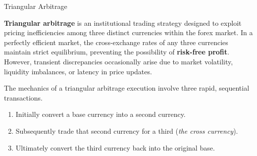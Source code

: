 \documentclass[10pt]{article}
\begin{document}
    \begin{core}{Triangular Arbitrage}

      \textbf{Triangular arbitrage} is an institutional trading strategy designed to exploit pricing inefficiencies among three distinct currencies within the forex market. In a perfectly efficient market, the cross-exchange rates of any three currencies maintain strict equilibrium, preventing the possibility of \textbf{risk-free profit}. However, transient discrepancies occasionally arise due to market volatility, liquidity imbalances, or latency in price updates.

      The mechanics of a triangular arbitrage execution involve three rapid, sequential transactions.

      \begin{enumerate}[label=(\arabic*)]

        \item Initially convert a base currency into a second currency.

        \item Subsequently trade that second currency for a third (\textit{the cross currency}).

        \item Ultimately convert the third currency back into the original base. 

      \end{enumerate}


\end{core}
\end{document}
